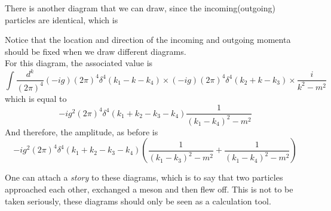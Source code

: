 \documentclass[11pt]{article}
\numberwithin{equation}{section}
\begin{document}
    There is another diagram that we can draw, since the incoming(outgoing) particles are identical, which is 
    \begin{figure}[h]
        \centering
    \end{figure}

    Notice that the location and direction of the incoming and outgoing momenta should be fixed when we draw different diagrams.\\
    For this diagram, the associated value is 
    \begin{equation*}
        \int \frac{d^k}{(2\pi)^4}(-ig)(2\pi)^4\delta^4(k_1 - k - k_4)\times(-ig)(2\pi)^4\delta^4(k_2 + k - k_3)\times \frac{i}{k^2 - m^2 } 
    \end{equation*}
    which is equal to 
    \begin{equation*}
        -ig^2 (2\pi)^4\delta^4(k_1 +k_2 - k_3 - k_4) \frac{1}{(k_1 - k_4)^2 - m^2}
    \end{equation*}
    And therefore, the amplitude, as before is 
    \begin{equation*}
        -ig^2 (2\pi)^4\delta^4(k_1 +k_2 - k_3 - k_4) \left( \frac{1}{(k_1 - k_3)^2 - m^2 } + \frac{1}{(k_1 - k_4)^2 - m^2 } \right)
    \end{equation*}

    One can attach a \textit{story} to these diagrams, which is to say that two particles approached each other, exchanged a meson and then flew off. This is not to be taken seriously, these diagrams should only be seen as a calculation tool.\\
\end{document}
